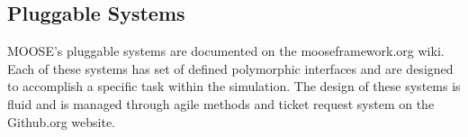 \documentclass{INLreport}
\begin{document}
\subsection{Pluggable Systems}
MOOSE's pluggable systems are documented on the mooseframework.org wiki. Each of these systems has set of defined polymorphic
interfaces and are designed to accomplish a specific task within the simulation. The design of these systems is fluid and is
managed through agile methods and ticket request system on the Github.org website.
\end{document}
